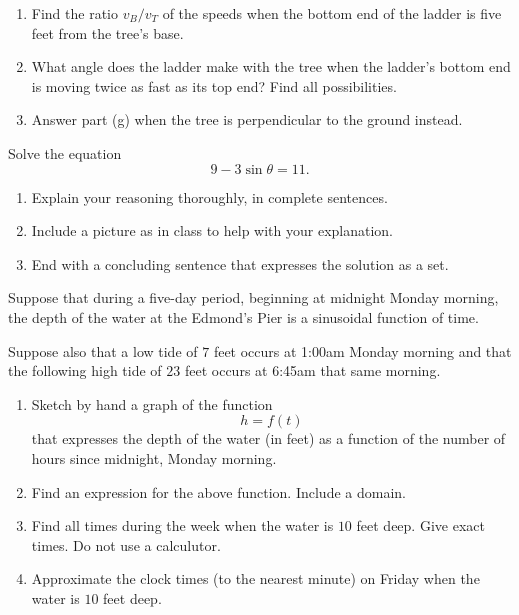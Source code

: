 \documentclass{ximera}
\begin{document}
\begin{question}
\begin{enumerate}
\item Find the ratio $v_B/v_T$ of the speeds when the bottom end of the ladder is five feet from the tree's base.

\item What angle does the ladder make with the tree when the ladder's bottom end is moving twice as fast as its top end? Find all possibilities.

\item Answer part (g) when the tree is perpendicular to the ground instead.

\end{enumerate}

\end{question}

\begin{question}  \label{Q34hghnbnnh}
Solve the equation
\[
        9 - 3 \sin \theta = 11 .
\]

\begin{enumerate}
\item Explain your reasoning thoroughly, in complete sentences.

\item Include a picture as in class to help with your explanation.

\item End with a concluding sentence that expresses the solution as a set.
\end{enumerate}

\end{question}

\begin{question} \label{Qgfdfghjfd}
Suppose that during a five-day period, beginning at midnight Monday morning, the depth of the water at the Edmond's Pier is a sinusoidal function of time.

Suppose also that a low tide of $7$ feet occurs at 1:00am Monday morning and that the following high tide of $23$ feet occurs at 6:45am that same morning.  

\begin{enumerate}
\item Sketch by hand a graph of the function
\[
   h = f(t)
\] 
that expresses the depth of the water (in feet) as a function of the number of hours since midnight, Monday morning.

\item Find an expression for the above function. Include a domain.

\item Find all times during the week when the water is $10$ feet deep. Give exact times. Do not use a calculutor.

\item Approximate the clock times (to the nearest minute) on Friday when the water is $10$ feet deep.

\end{enumerate}


\end{question}
\end{document}
